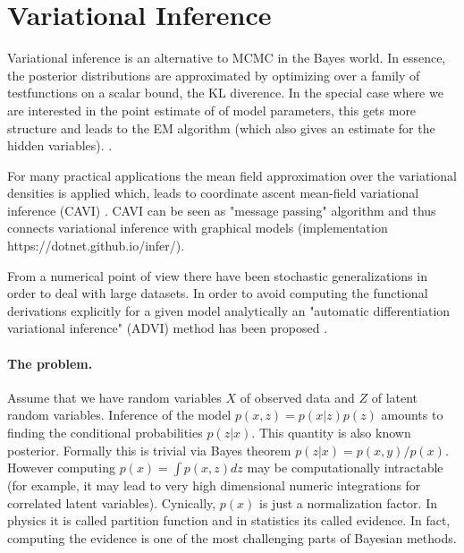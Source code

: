 \section{Variational Inference}
Variational inference \cite{blei2016variational, Beal03variationalalgorithms} is an alternative to MCMC in the Bayes world. 
In essence, the posterior distributions are approximated by optimizing over a family of testfunctions on a scalar bound, the KL diverence. In the special case where we are interested in the point estimate of of model parameters, this gets more structure and leads \cite{Neal:1999:VEA:308574.308679} to the EM algorithm \cite{Dempster77maximumlikelihood, Gupta:2011:TUE:1969852.1969853}(which also gives an estimate for the hidden variables).  \cite{doi:10.1080/01621459.1990.10476213}.

 For many practical applications the mean field approximation over the variational densities is applied which, leads to coordinate ascent mean-field variational inference (CAVI) \cite{Bishop:2006:PRM:1162264}. CAVI can be seen as "message passing" algorithm and thus connects variational inference with graphical models \cite{Winn:2005:VMP:1046920.1088695, wand_mfvb_2011, NIPS2011_4407, minka2005divergence} (implementation https://dotnet.github.io/infer/). 

From a numerical point of view there have been stochastic generalizations in order to deal with large datasets. In order to avoid computing the functional derivations explicitly for a given model analytically an "automatic differentiation variational inference" (ADVI) method has been proposed \cite{advi_2016}. 

\paragraph{The problem.} Assume that we have random variables $X$ of observed data and $Z$ of latent random variables. Inference of the model $p(x, z) = p(x|z)p(z)$ amounts to finding  the conditional probabilities $p(z|x)$. This quantity is also known posterior. Formally this is trivial via Bayes theorem $p(z | x) = p(x, y) / p(x)$. However computing $p(x) = \int p(x, z) dz$ may be computationally intractable (for example, it may lead to very high dimensional numeric integrations for correlated latent variables). 
Cynically, $p(x)$ is just a normalization factor. In physics it is called partition function and in statistics its called evidence. In fact, computing the evidence is one of the most challenging parts of Bayesian methods.


